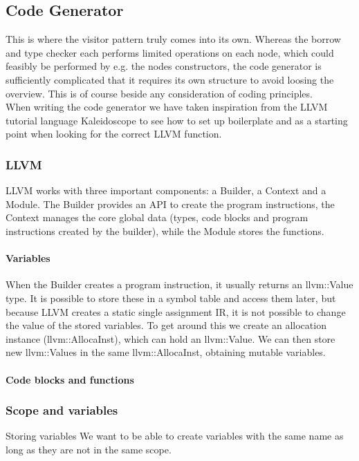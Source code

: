 \subsection{Code Generator}
\label{sec:CodeGenImplement}
This is where the visitor pattern truly comes into its own. Whereas the borrow and type checker each performs limited operations on each node, which could feasibly be performed by e.g. the nodes constructors, the code generator is sufficiently complicated that it requires its own structure to avoid loosing the overview. This is of course beside any consideration of coding principles.\\
When writing the code generator we have taken inspiration from the LLVM tutorial language Kaleidoscope \cite{LLVMTutorial} to see how to set up boilerplate and as a starting point when looking for the correct LLVM function.

\subsubsection{LLVM}
LLVM works with three important components: a Builder, a Context and a Module. The Builder provides an API to create the program instructions, the Context manages the core global data (types, code blocks and program instructions created by the builder), while the Module stores the functions.


\paragraph*{Variables}
When the Builder creates a program instruction, it usually returns an llvm::Value type. It is possible to store these in a symbol table and access them later, but because LLVM creates a static single assignment IR, it is not possible to change the value of the stored variables. To get around this we create an allocation instance (llvm::AllocaInst), which can hold an llvm::Value. We can then store new llvm::Values in the same llvm::AllocaInst, obtaining mutable variables.

\paragraph*{Code blocks and functions}


\subsubsection{Scope and variables}
Storing variables 
We want to be able to create variables with the same name as long as they are not in the same scope. 

